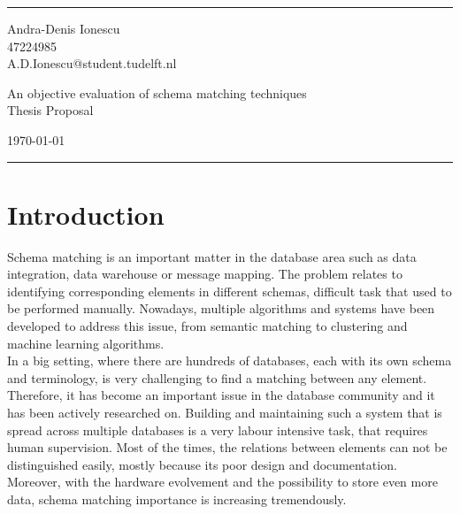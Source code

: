 \documentclass[a4paper]{article}
\begin{document}

\fancyhead[C]{}
\hrule \medskip %
\begin{minipage}{0.295\textwidth} 
\raggedright
\footnotesize
Andra-Denis Ionescu \hfill\\   
47224985 \hfill\\
A.D.Ionescu@student.tudelft.nl
\end{minipage}
\begin{minipage}{0.4\textwidth} 
\centering 
\large 
An objective evaluation of schema matching techniques\\ 
\normalsize 
Thesis Proposal\\ 
\end{minipage}
\begin{minipage}{0.295\textwidth} 
\raggedleft
\today\hfill\\
\end{minipage}
\medskip\hrule 
\bigskip


\section{Introduction}

Schema matching is an important matter in the database area such as data integration, data warehouse or message mapping. The problem relates to identifying corresponding elements in different schemas, difficult task that used to be performed manually. Nowadays, multiple algorithms and systems have been developed to address this issue, from semantic matching to clustering and machine learning algorithms. \\

In a big setting, where there are hundreds of databases, each with its own schema and terminology, is very challenging to find a matching between any element. Therefore, it has become an important issue in the database community and it has been actively researched on. Building and maintaining such a system that is spread across multiple databases is a very labour intensive task, that requires human supervision. Most of the times, the relations between elements can not be distinguished easily, mostly because its poor design and documentation. Moreover, with the hardware evolvement and the possibility to store even more data, schema matching importance is increasing tremendously. \\
\end{document}
